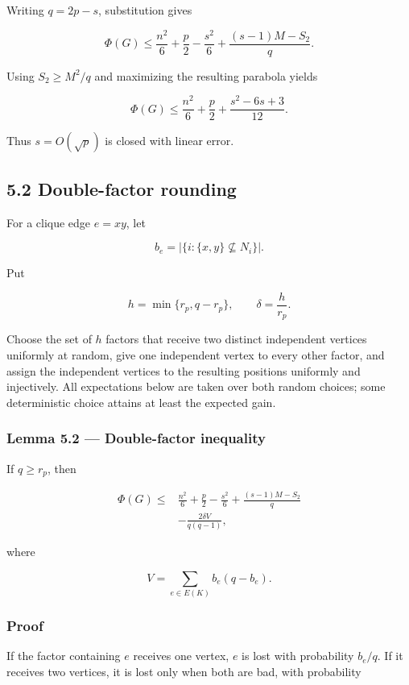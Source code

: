 \documentclass[
  11pt,
]{article}
\begin{document}
Writing \(q=2p-s\), substitution gives

\[
\Phi(G)
\le
\frac{n^2}{6}+\frac p2-\frac{s^2}{6}
+
\frac{(s-1)M-S_2}{q}.
\tag{5.2}
\]

Using \(S_2\ge M^2/q\) and maximizing the resulting parabola yields

\[
\boxed{
\Phi(G)
\le
\frac{n^2}{6}+\frac p2+\frac{s^2-6s+3}{12}.
}
\tag{5.3}
\]

Thus \(s=O(\sqrt p)\) is closed with linear error.

\subsection{5.2 Double-factor rounding}\label{double-factor-rounding}

For a clique edge \(e=xy\), let

\[
b_e=|\{i:\{x,y\}\not\subseteq N_i\}|.
\]

Put

\[
h=\min\{r_p,q-r_p\},
\qquad
\delta=\frac h{r_p}.
\]

Choose the set of \(h\) factors that receive two distinct independent
vertices uniformly at random, give one independent vertex to every other
factor, and assign the independent vertices to the resulting positions
uniformly and injectively. All expectations below are taken over both
random choices; some deterministic choice attains at least the expected
gain.

\subsubsection{Lemma 5.2 --- Double-factor
inequality}\label{lemma-5.2-double-factor-inequality}

If \(q\ge r_p\), then

\[
\boxed{
\begin{aligned}
\Phi(G)
\le{}&
\frac{n^2}{6}+\frac p2-\frac{s^2}{6}
+
\frac{(s-1)M-S_2}{q}\\
&-
\frac{2\delta V}{q(q-1)},
\end{aligned}
}
\tag{5.4}
\]

where

\[
V=\sum_{e\in E(K)}b_e(q-b_e).
\tag{5.5}
\]

\subsubsection{Proof}\label{proof-4}

If the factor containing \(e\) receives one vertex, \(e\) is lost with
probability \(b_e/q\). If it receives two vertices, it is lost only when
both are bad, with probability
\end{document}
